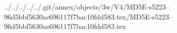 ../../../../../.git/annex/objects/3w/V4/MD5E-s5223--96d5bbf5630ae696117f7bac10fdd583.tex/MD5E-s5223--96d5bbf5630ae696117f7bac10fdd583.tex